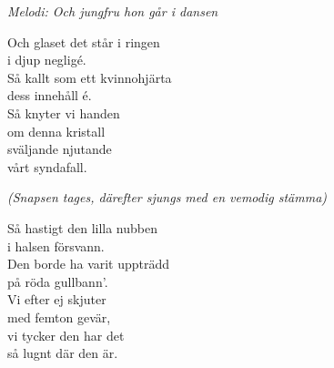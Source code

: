 {\footnotesize\textit{Melodi: Och jungfru hon går i dansen}}\par
\vspace{10pt}
Och glaset det står i ringen\\
i djup negligé.\\
Så kallt som ett kvinnohjärta\\
dess innehåll é.\\
Så knyter vi handen\\
om denna kristall\\
sväljande njutande\\
vårt syndafall.\par
\vspace{10pt}
\textit{(Snapsen tages, därefter sjungs med en vemodig stämma)}\par
\vspace{10pt}
Så hastigt den lilla nubben\\
i halsen försvann.\\
Den borde ha varit uppträdd\\
på röda gullbann'.\\
Vi efter ej skjuter\\
med femton gevär,\\
vi tycker den har det\\
så lugnt där den är.
